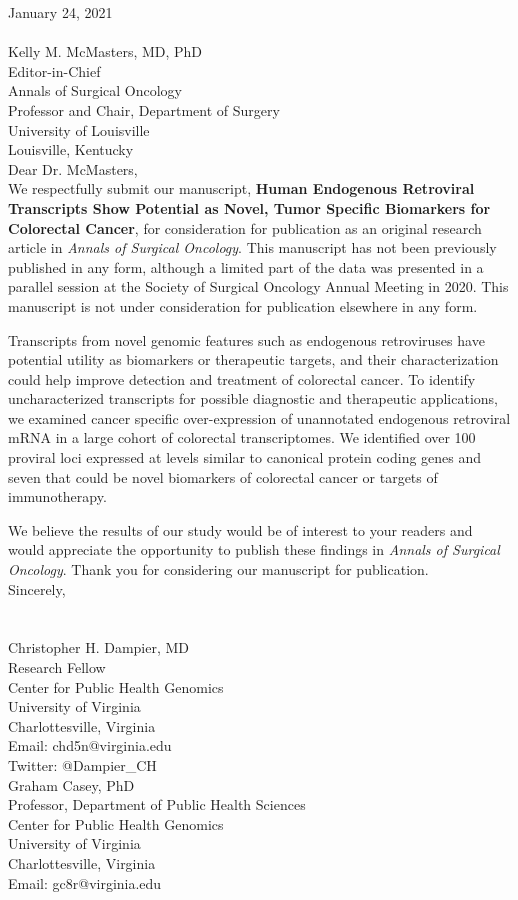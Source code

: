 \documentclass[11pt,letterpaper]{article}  %
\begin{document}
January 24, 2021 \\
\\
Kelly M. McMasters, MD, PhD \\
Editor-in-Chief \\
Annals of Surgical Oncology \\
Professor and Chair, Department of Surgery \\
University of Louisville \\
Louisville, Kentucky \\

Dear Dr. McMasters, \\

We respectfully submit our manuscript, \textbf{Human Endogenous Retroviral Transcripts Show Potential as Novel, Tumor Specific Biomarkers for Colorectal Cancer}, for consideration for publication as an original research article in \emph{Annals of Surgical Oncology}.
This manuscript has not been previously published in any form, although a limited part of the data was presented in a parallel session at the Society of Surgical Oncology Annual Meeting in 2020.
This manuscript is not under consideration for publication elsewhere in any form.

Transcripts from novel genomic features such as endogenous retroviruses have potential utility as biomarkers or therapeutic targets, and their characterization could help improve detection and treatment of colorectal cancer.
To identify uncharacterized transcripts for possible diagnostic and therapeutic applications, we examined cancer specific over-expression of unannotated endogenous retroviral mRNA in a large cohort of colorectal transcriptomes.
We identified over 100 proviral loci expressed at levels similar to canonical protein coding genes and seven that could be novel biomarkers of colorectal cancer or targets of immunotherapy.

We believe the results of our study would be of interest to your readers and would appreciate the opportunity to publish these findings in \emph{Annals of Surgical Oncology}. Thank you for considering our manuscript for publication. \\

Sincerely,\\
\\
\\
Christopher H. Dampier, MD \\
Research Fellow \\
Center for Public Health Genomics \\
University of Virginia \\
Charlottesville, Virginia \\
Email: chd5n@virginia.edu \\
Twitter: @Dampier\_CH \\

Graham Casey, PhD \\
Professor, Department of Public Health Sciences \\
Center for Public Health Genomics \\
University of Virginia \\
Charlottesville, Virginia \\
Email: gc8r@virginia.edu

\thispagestyle{empty}
\end{document}
